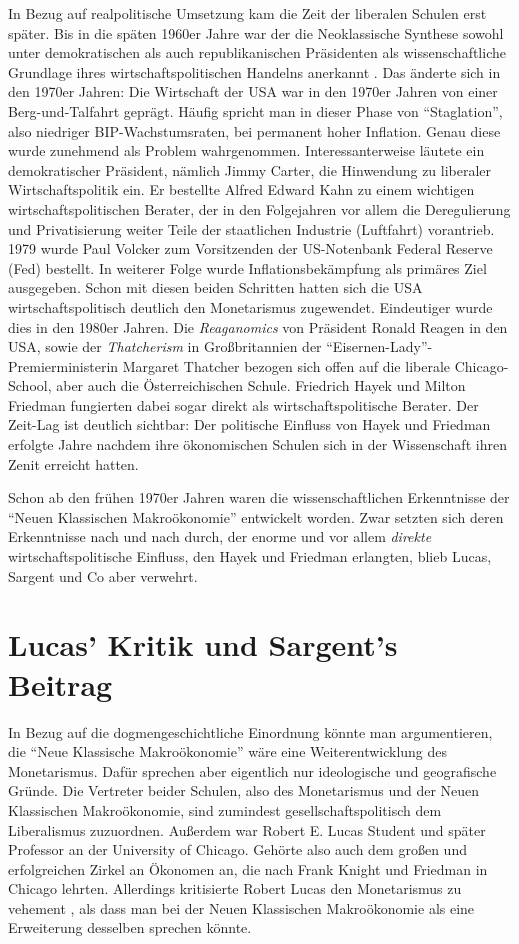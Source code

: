 In Bezug auf realpolitische Umsetzung kam die Zeit der liberalen Schulen erst später. Bis in die späten 1960er Jahre war der die Neoklassische Synthese sowohl unter demokratischen als auch republikanischen Präsidenten als wissenschaftliche Grundlage ihres wirtschaftspolitischen Handelns anerkannt \parencite[S. 12]{Woodford1999}. Das änderte sich in den 1970er Jahren: Die Wirtschaft der USA war in den 1970er Jahren von einer Berg-und-Talfahrt geprägt. Häufig spricht man in dieser Phase von "`Staglation"', also niedriger BIP-Wachstumsraten, bei permanent hoher Inflation. Genau diese wurde zunehmend als Problem wahrgenommen. Interessanterweise läutete ein demokratischer Präsident, nämlich Jimmy Carter, die Hinwendung zu liberaler Wirtschaftspolitik ein. Er bestellte Alfred Edward Kahn zu einem wichtigen wirtschaftspolitischen Berater, der in den Folgejahren vor allem die Deregulierung und Privatisierung weiter Teile der staatlichen Industrie (Luftfahrt) vorantrieb. 1979 wurde Paul Volcker zum Vorsitzenden der US-Notenbank Federal Reserve (Fed) bestellt. In weiterer Folge wurde Inflationsbekämpfung als primäres Ziel ausgegeben. Schon mit diesen beiden Schritten hatten sich die USA wirtschaftspolitisch deutlich den Monetarismus zugewendet. Eindeutiger wurde dies in den 1980er Jahren. Die \textit{Reaganomics} von Präsident Ronald Reagen in den USA, sowie der \textit{Thatcherism} in Großbritannien der "`Eisernen-Lady"'-Premierministerin Margaret Thatcher bezogen sich offen auf die liberale Chicago-School, aber auch die Österreichischen Schule. Friedrich Hayek und Milton Friedman fungierten dabei sogar direkt als wirtschaftspolitische Berater. Der Zeit-Lag ist deutlich sichtbar: Der politische Einfluss von Hayek und Friedman erfolgte Jahre nachdem ihre ökonomischen Schulen sich in der Wissenschaft ihren Zenit erreicht hatten.

Schon ab den frühen 1970er Jahren waren die wissenschaftlichen Erkenntnisse der "`Neuen Klassischen Makroökonomie"' entwickelt worden. Zwar setzten sich deren Erkenntnisse nach und nach durch, der enorme und vor allem \textit{direkte} wirtschaftspolitische Einfluss, den Hayek und Friedman erlangten, blieb Lucas, Sargent und Co aber verwehrt.



\section{Lucas' Kritik und Sargent's Beitrag}
In Bezug auf die dogmengeschichtliche Einordnung könnte man argumentieren, die "`Neue Klassische Makroökonomie"' wäre eine Weiterentwicklung des Monetarismus. Dafür sprechen aber eigentlich nur ideologische und geografische Gründe. Die Vertreter beider Schulen, also des Monetarismus und der Neuen Klassischen Makroökonomie, sind zumindest gesellschaftspolitisch dem Liberalismus zuzuordnen. Außerdem war Robert E. Lucas Student und später Professor an der University of Chicago. Gehörte also auch dem großen und erfolgreichen Zirkel an Ökonomen an, die nach Frank Knight und Friedman in Chicago lehrten. Allerdings kritisierte Robert Lucas den Monetarismus zu vehement \parencite[S. 121]{Lucas1972}, als dass man bei der Neuen Klassischen Makroökonomie als eine Erweiterung desselben sprechen könnte.  

